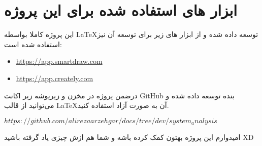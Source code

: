 \newpage

\section{ابزار های استفاده شده برای این پروژه}

این پروژه کاملا بواسطه \LaTeX توسعه داده شده و از ابزار های زیر برای توسعه آن نیز استفاده شده است:

\begin{itemize}
	\item \hyperref[https://app.smartdraw.com]{https://app.smartdraw.com}
	\item \hyperref[https://app.creately.com]{https://app.creately.com}
\end{itemize}

درضمن پروژه در مخزن و زیرپوشه زیر اکانت GitHub بنده توسعه داده شده و می‌توانید از قالب \LaTeX آن به صورت آزاد استفاده کنید.

$\hyperref[https://github.com/alirezaarzehgar/docs/tree/dev/system_analysis]{https://github.com/alirezaarzehgar/docs/tree/dev/system_analysis}$

امیدوارم این پروژه بهتون کمک کرده باشه و شما هم ازش چیزی یاد گرفته باشید XD
